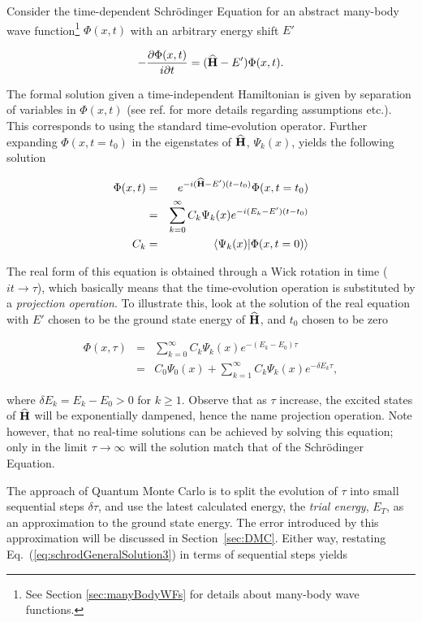 Consider the time-dependent Schrödinger Equation for an abstract many-body wave function\footnote{See Section \ref{sec:manyBodyWFs} for details about many-body wave functions.} $\Phi(x, t)$ with an arbitrary energy shift $E'$

\begin{equation}
 -\frac{\partial \Phi(x, t)}{i\partial t} = ({\bf\widehat{H}} - E')\Phi(x, t).
\end{equation}

The formal solution given a time-independent Hamiltonian is given by separation of variables in $\Phi(x, t)$ (see ref. \cite{griffiths} for more details regarding assumptions etc.). This corresponds to using the standard time-evolution operator. Further expanding $\Phi(x, t=t_0)$ in the eigenstates of ${\bf\widehat{H}}$, $\Psi_k(x)$, yields the following solution

\begin{eqnarray}
 \Phi(x, t) &=& e^{-i({\bf\widehat{H}} - E')(t-t_0)}\Phi(x, t=t_0) \label{eq:schrodGeneralSolution} \\
            &=& \sum_{k=0}^{\infty} C_k\Psi_k(x)e^{-i(E_k - E')(t-t_0)} \label{eq:realSchrod} \\
 C_k &=& \left\langle \Psi_k(x) | \Phi(x, t=0)\right\rangle \nonumber
 \end{eqnarray}


The real form of this equation is obtained through a Wick rotation in time ($it \rightarrow \tau$), which basically means that the time-evolution operation is substituted by a \textit{projection operation}. To illustrate this, look at the solution of the real equation with $E'$ chosen to be the ground state energy of ${\bf\widehat{H}}$, and $t_0$ chosen to be zero

\begin{eqnarray}
 \Phi(x, \tau) &=& \sum_{k=0}^{\infty} C_k\Psi_k(x)e^{-(E_k - E_0)\tau} \label{eq:schrodGeneralSolution3}\\
                    &=& C_0\Psi_0(x) + \sum_{k=1}^{\infty} C_k\Psi_k(x)e^{-\delta E_k\tau}, \label{eq:schrodGeneralSolution2}
\end{eqnarray}

where $\delta E_k = E_k - E_0 > 0$ for $k \ge 1$. Observe that as $\tau$ increase, the excited states of ${\bf\widehat{H}}$ will be exponentially dampened, hence the name projection operation. Note however, that no real-time solutions can be achieved by solving this equation; only in the limit $\tau\rightarrow\infty$ will the solution match that of the Schrödinger Equation. 

The approach of Quantum Monte Carlo is to split the evolution of $\tau$ into small sequential steps $\delta\tau$, and use the latest calculated energy, the \textit{trial energy}, $E_T$, as an approximation to the ground state energy. The error introduced by this approximation will be discussed in Section~\ref{sec:DMC}. Either way, restating Eq.~(\ref{eq:schrodGeneralSolution3}) in terms of sequential steps yields


